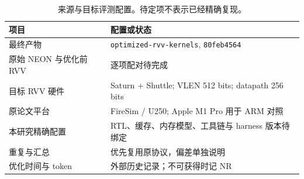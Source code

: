 \begin{table}[htbp]
\centering
\small
\caption{来源与目标评测配置。待定项不表示已经精确复现。}
\label{tab:setup}
\begin{tabular}{@{}p{.24\linewidth}p{.67\linewidth}@{}}
\toprule
项目 & 配置或状态 \\
\midrule
最终产物 & \texttt{optimized-rvv-kernels}, \texttt{80feb4564} \\
原始 NEON 与优化前 RVV & 逐项配对待完成 \\
目标 RVV 硬件 & Saturn + Shuttle; VLEN 512 bits; datapath 256 bits \\
原论文平台 & FireSim / U250; Apple M1 Pro 用于 ARM 对照 \\
本研究精确配置 & RTL、缓存、内存模型、工具链与 harness 版本待绑定 \\
重复与汇总 & 优先复用原协议，偏差单独说明 \\
优化时间与 token & 外部历史记录；不可获得时记 NR \\
\bottomrule
\end{tabular}
\end{table}
